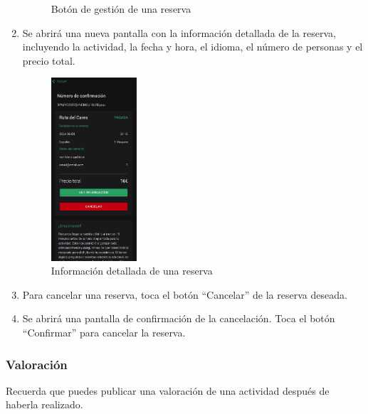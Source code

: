 \begin{enumerate}
\begin{figure}[H]
		      \caption{Botón de gestión de una reserva}
	      \end{figure}
	\item Se abrirá una nueva pantalla con la información detallada de la reserva, incluyendo la actividad, la fecha y hora, el idioma, el número de personas y el precio total.
	      \begin{figure}[H]
		      \centering
		      \includegraphics[width=0.3\textwidth]{7-Construccion/Manuales/app/P3-GestionReserva.png}
		      \caption{Información detallada de una reserva}
	      \end{figure}
	\item Para cancelar una reserva, toca el botón “Cancelar” de la reserva deseada.
	\item Se abrirá una pantalla de confirmación de la cancelación. Toca el botón “Confirmar” para cancelar la reserva.
\end{enumerate}

\subsubsection{Valoración}
Recuerda que puedes publicar una valoración de una actividad después de haberla realizado.

